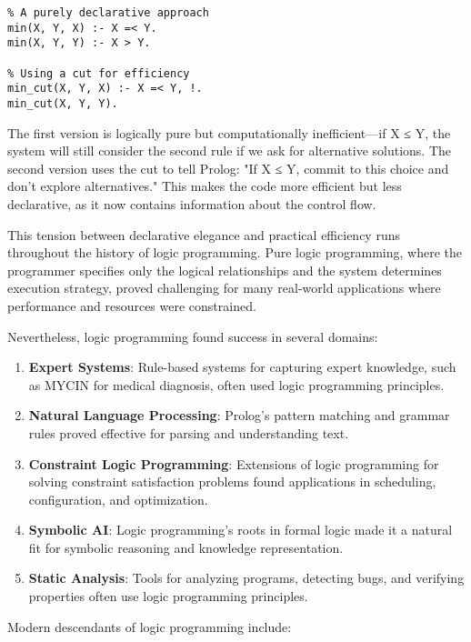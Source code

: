 \documentclass[11pt]{article}
\begin{document}
\begin{verbatim}
% A purely declarative approach
min(X, Y, X) :- X =< Y.
min(X, Y, Y) :- X > Y.

% Using a cut for efficiency
min_cut(X, Y, X) :- X =< Y, !.
min_cut(X, Y, Y).
\end{verbatim}

The first version is logically pure but computationally inefficient—if X ≤ Y, the system will still consider the second rule if we ask for alternative solutions. The second version uses the cut to tell Prolog: "If X ≤ Y, commit to this choice and don't explore alternatives." This makes the code more efficient but less declarative, as it now contains information about the control flow.

This tension between declarative elegance and practical efficiency runs throughout the history of logic programming. Pure logic programming, where the programmer specifies only the logical relationships and the system determines execution strategy, proved challenging for many real-world applications where performance and resources were constrained.

Nevertheless, logic programming found success in several domains:

\begin{enumerate}
\item \textbf{Expert Systems}: Rule-based systems for capturing expert knowledge, such as MYCIN for medical diagnosis, often used logic programming principles.

\item \textbf{Natural Language Processing}: Prolog's pattern matching and grammar rules proved effective for parsing and understanding text.

\item \textbf{Constraint Logic Programming}: Extensions of logic programming for solving constraint satisfaction problems found applications in scheduling, configuration, and optimization.

\item \textbf{Symbolic AI}: Logic programming's roots in formal logic made it a natural fit for symbolic reasoning and knowledge representation.

\item \textbf{Static Analysis}: Tools for analyzing programs, detecting bugs, and verifying properties often use logic programming principles.
\end{enumerate}

Modern descendants of logic programming include:
\end{document}
